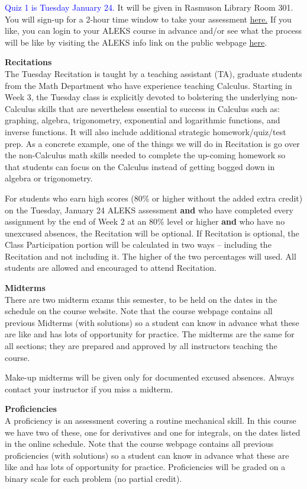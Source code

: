 \documentclass[12pt]{article}
\renewcommand{\emph}[1]{\textsf{\textbf{#1}}}
\newcommand{\localhead}[1]{\par\smallskip\textbf{#1}\nobreak\\}%
\def\heading#1{\localhead{\large\emph{#1}}}
\begin{document}
\textcolor{blue}{Quiz 1 is Tuesday January 24.} It will be given in Rasmuson Library Room 301. You will sign-up for a 2-hour time window to take your assessment \href{https://aleks-testing.youcanbook.me/}{here.} If you like, you can login to your ALEKS course in advance and/or see what the process will be like by visiting the ALEKS info link on the public webpage \href{https://uaf-math251.github.io/week1-ALEKS.html}{here}.


\heading{Recitations}
The Tuesday Recitation is taught by a teaching assistant (TA), graduate students from the Math  Department who have experience teaching Calculus. Starting in Week 3, the Tuesday class is explicitly devoted to bolstering the underlying non-Calculus skills that are nevertheless essential to success in Calculus such as: graphing, algebra, trigonometry, exponential and logarithmic functions, and inverse functions. It will also include additional strategic homework/quiz/test prep. As a concrete example, one of the things we will do in Recitation is go over the non-Calculus math skills needed to complete the up-coming homework so that students can focus on the Calculus instead of getting bogged down in algebra or trigonometry.

For students who earn high scores (80\% or higher without the added extra credit) on the Tuesday, January 24 ALEKS assessment \textbf{and} who have completed every assignment by the end of Week 2 at an 80\% level or higher \textbf{and} who have no unexcused absences, the Recitation will be optional. If Recitation is optional, the Class Participation portion will be calculated in two ways -- including the Recitation and not  including it. The higher of the two percentages will used. All students are allowed and encouraged to attend Recitation.

\heading{Midterms}
There are two midterm exams this semester, to be held on the dates
in the schedule on the course website. Note that the course webpage contains all previous Midterms (with solutions) so a student can know in advance what these are like and has lots of opportunity for practice. The midterms are the same 
for all sections; they are prepared and approved by all instructors teaching the course. 

Make-up midterms will be given only for documented excused absences. Always contact your instructor if you miss a midterm.

\heading{Proficiencies}
A proficiency is an assessment covering a routine mechanical skill.  In
this course we have two of these, one for derivatives and one for 
integrals, on the dates listed in the online schedule. Note that the course webpage contains all previous proficiencies (with solutions) so a student can know in advance what these are like and has lots of opportunity for practice.
Proficiencies will be graded on a binary scale for each problem
(no partial credit).  
\end{document}
